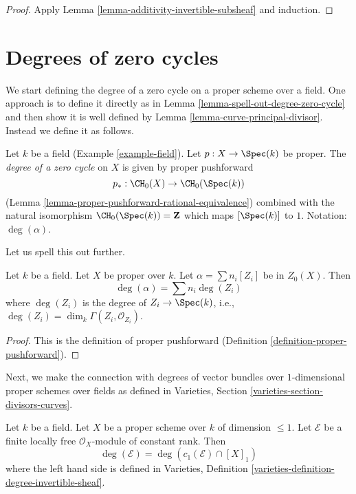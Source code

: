 \begin{proof}
Apply Lemma \ref{lemma-additivity-invertible-subsheaf} and induction.
\end{proof}




\section{Degrees of zero cycles}
\label{section-degree-zero-cycles}

\noindent
We start defining the degree of a zero cycle on a proper scheme over a field.
One approach is to define it directly as in
Lemma \ref{lemma-spell-out-degree-zero-cycle} and then show
it is well defined by
Lemma \ref{lemma-curve-principal-divisor}.
Instead we define it as follows.

\begin{definition}
\label{definition-degree-zero-cycle}
Let $k$ be a field (Example \ref{example-field}). Let $p : X \to \Spec(k)$
be proper. The {\it degree of a zero cycle} on $X$ is given by proper
pushforward
$$
p_* : \CH_0(X) \to \CH_0(\Spec(k))
$$
(Lemma \ref{lemma-proper-pushforward-rational-equivalence})
combined with the natural isomorphism $\CH_0(\Spec(k)) = \mathbf{Z}$
which maps $[\Spec(k)]$ to $1$. Notation: $\deg(\alpha)$.
\end{definition}

\noindent
Let us spell this out further.

\begin{lemma}
\label{lemma-spell-out-degree-zero-cycle}
Let $k$ be a field. Let $X$ be proper over $k$. Let $\alpha = \sum n_i[Z_i]$
be in $Z_0(X)$. Then
$$
\deg(\alpha) = \sum n_i\deg(Z_i)
$$
where $\deg(Z_i)$ is the degree of $Z_i \to \Spec(k)$, i.e.,
$\deg(Z_i) = \dim_k \Gamma(Z_i, \mathcal{O}_{Z_i})$.
\end{lemma}

\begin{proof}
This is the definition of proper pushforward
(Definition \ref{definition-proper-pushforward}).
\end{proof}

\noindent
Next, we make the connection with degrees of vector bundles
over $1$-dimensional proper schemes over fields as defined in
Varieties, Section \ref{varieties-section-divisors-curves}.

\begin{lemma}
\label{lemma-degree-vector-bundle}
Let $k$ be a field. Let $X$ be a proper scheme over $k$ of dimension $\leq 1$.
Let $\mathcal{E}$ be a finite locally free $\mathcal{O}_X$-module of constant
rank. Then
$$
\deg(\mathcal{E}) = \deg(c_1(\mathcal{E}) \cap [X]_1)
$$
where the left hand side is defined in
Varieties, Definition \ref{varieties-definition-degree-invertible-sheaf}.
\end{lemma}

